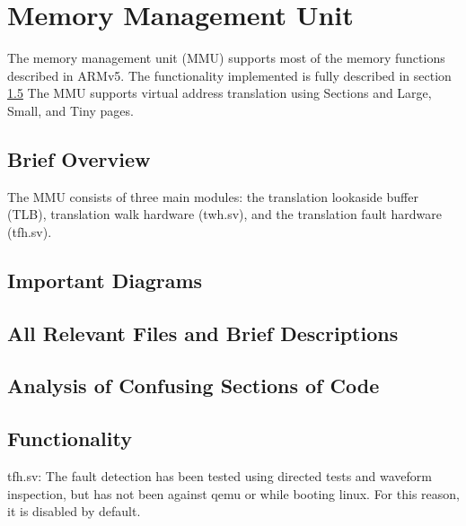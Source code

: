 \section{Memory Management Unit}
The memory management unit (MMU) supports most of the memory functions described in ARMv5.
The functionality implemented is fully described in section \ref{sec:mmufunct}
The MMU supports virtual address translation using Sections and Large, Small, and Tiny pages.

\subsection{Brief Overview}

The MMU consists of three main modules: the translation lookaside buffer (TLB), translation walk hardware (twh.sv), and the translation fault hardware (tfh.sv). 

\subsection{Important Diagrams}


\subsection{All Relevant Files and Brief Descriptions}


\subsection{Analysis of Confusing Sections of Code}

\subsection{Functionality}
\label{sec:mmufunct}

\begin{list}
\item tfh.sv: 
The fault detection has been tested using directed tests and waveform inspection, but has not been against qemu or while booting linux.
For this reason, it is disabled by default.
\end{list}

